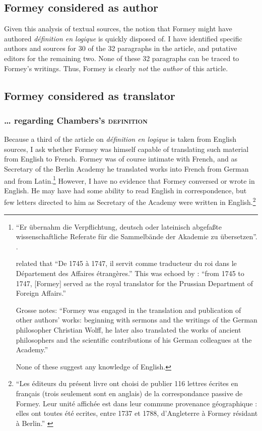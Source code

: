 \documentclass[output=paper]{langscibook}
\begin{document}
\subsection{Formey considered as author}

Given this analysis of textual sources, the notion that Formey might have authored \emph{définition en logique} is quickly disposed of. I have identified specific authors and sources for 30 of the 32 paragraphs in the article, and putative editors for the remaining two. None of these 32 paragraphs can be traced to Formey’s writings. Thus, Formey is clearly \emph{not} the \emph{author} of this article.

\subsection{Formey considered as translator}
\subsubsection{… regarding Chambers’s \textsc{definition}}

Because a third of the article on \emph{définition en logique} is taken from English sources, I ask whether Formey was himself capable of translating such material from English to French. Formey was of course intimate with French, and as Secretary of the Berlin Academy he translated works into French from German and from Latin.\footnote{“Er übernahm die Verpflichtung, deutsch oder lateinisch abgefaßte wissenschaftliche Referate für die Sammelbände der Akademie zu übersetzen”. \citep[55]{Krauss1963Akademiesekretär}.

\citet{Thomson1980} related that “De 1745 à 1747, il servit comme traducteur du roi dans le Département des Affaires étrangères.” This was echoed by \citet[140]{KafkerKafker1988}: “from 1745 to 1747, [Formey] served as the royal translator for the Prussian Department of Foreign Affairs.”

Grosse notes: “Formey was engaged in the translation and publication of other authors' works: beginning with sermons and the writings of the German philosopher Christian Wolff, he later also translated the works of ancient philosophers and the scientific contributions of his German colleagues at the Academy.” \citep[10]{Grosse2018}

None of these suggest any knowledge of English.
}  However, I have no evidence that Formey conversed or wrote in English. He may have had some ability to read English in correspondence, but few letters directed to him as Secretary of the Academy were written in English.\footnote{“Les éditeurs du présent livre ont choisi de publier 116 lettres écrites en français (trois seulement sont en anglais) de la correspondance passive de Formey. Leur unité affichée est dans leur commune provenance géographique : elles ont toutes été ecrites, entre 1737 et 1788, d'Angleterre à Formey résidant à Berlin.” \citep[137]{Hubac2007}}
\end{document}
